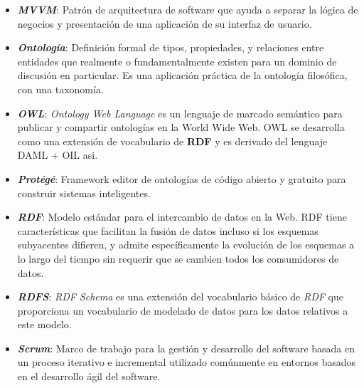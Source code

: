 \begin{itemize}
    \item \textbf{\textit{MVVM}}: Patrón de arquitectura de software que
    ayuda a separar la lógica de negocios y presentación de una aplicación 
    de su interfaz de usuario. 

    \item \textbf{\textit{Ontología}}:  Definición formal de tipos, propiedades, 
    y relaciones entre entidades que realmente o fundamentalmente existen 
    para un dominio de discusión en particular. Es una aplicación práctica 
    de la ontología filosófica, con una taxonomía.

    \item \textbf{\textit{OWL}}: \emph{Ontology Web Language} es un lenguaje 
    de marcado semántico para publicar y compartir ontologías en la 
    World Wide Web. OWL se desarrolla como una extensión de vocabulario 
    de \textbf{RDF} y es derivado del lenguaje DAML + OIL asi.


    \item \textbf{\textit{Protégé}}: Framework editor de ontologías de 
    código abierto y gratuito para construir sistemas inteligentes.

    \item \textbf{\textit{RDF}}: Modelo estándar para el 
    intercambio de datos en la Web. RDF tiene características que 
    facilitan la fusión de datos incluso si los esquemas subyacentes 
    difieren, y admite específicamente la evolución de los esquemas a 
    lo largo del tiempo sin requerir que se cambien todos los 
    consumidores de datos.

    \item \textbf{\textit{RDFS}}: \emph{RDF Schema} es una 
    extensión del vocabulario básico de \emph{RDF} que proporciona un 
    vocabulario de modelado de datos para los datos relativos a este modelo.

    \item \textbf{\textit{Scrum}}: Marco de trabajo para la gestión y 
    desarrollo del software basada en un proceso iterativo e incremental 
    utilizado comúnmente en entornos basados en el desarrollo ágil del
    software.
    

\end{itemize}
